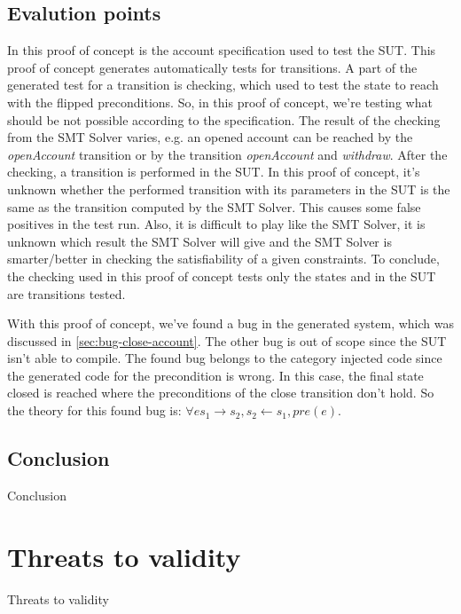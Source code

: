 \subsection{Evalution points}
In this proof of concept is the account specification used to test the SUT.
This proof of concept generates automatically tests for transitions. A part of
the generated test for a transition is checking, which used to test the state to
reach with the flipped preconditions. So, in this proof of concept, we're
testing what should be not possible according to the specification. The result
of the checking from the SMT Solver varies, e.g. an opened account can be
reached by the \textit{openAccount} transition or by the transition
\textit{openAccount} and \textit{withdraw}. After the checking, a transition
is performed in the SUT. In this proof of concept, it's unknown whether the
performed transition with its parameters in the SUT is the same as the
transition computed by the SMT Solver. This causes some false positives in the
test run. Also, it is difficult to play like the SMT Solver, it is unknown which
result the SMT Solver will give and the SMT Solver is smarter/better in checking
the satisfiability of a given constraints. To conclude, the checking used in
this proof of concept tests only the states and in the SUT are transitions
tested.

With this proof of concept, we've found a bug in the generated system, which was
discussed in \autoref{sec:bug-close-account}. The other bug is out of scope
since the SUT isn't able to compile. The found bug belongs to the category
injected code since the generated code for the precondition is wrong. In this
case, the final state closed is reached where the preconditions of the close
transition don't hold. So the theory for this found bug is:
$\forall e s_{1} \to s_{2}, s_{2} \gets s_{1}, pre(e)$.




\subsection{Conclusion}
Conclusion

\section{Threats to validity}
Threats to validity
